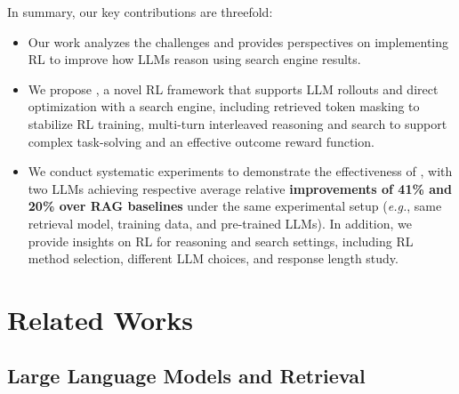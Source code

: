 In summary, our key contributions are threefold:
\begin{itemize}[leftmargin=*]
    \item Our work analyzes the challenges and provides perspectives on implementing RL to improve how LLMs reason using search engine results.
    \item We propose \Ours, a novel RL framework that supports LLM rollouts and direct optimization with a search engine, including retrieved token masking to stabilize RL training, multi-turn interleaved reasoning and search to support complex task-solving and an effective outcome reward function.
    \item We conduct systematic experiments to demonstrate the effectiveness of \Ours, with two LLMs achieving respective average relative \textbf{improvements of 41\% and 20\% over RAG baselines} under the same experimental setup (\textit{e.g.}, same retrieval model, training data, and pre-trained LLMs). In addition, we provide insights on RL for reasoning and search settings, including RL method selection, different LLM choices, and response length study.
\end{itemize}

\section{Related Works}

\subsection{Large Language Models and Retrieval}


